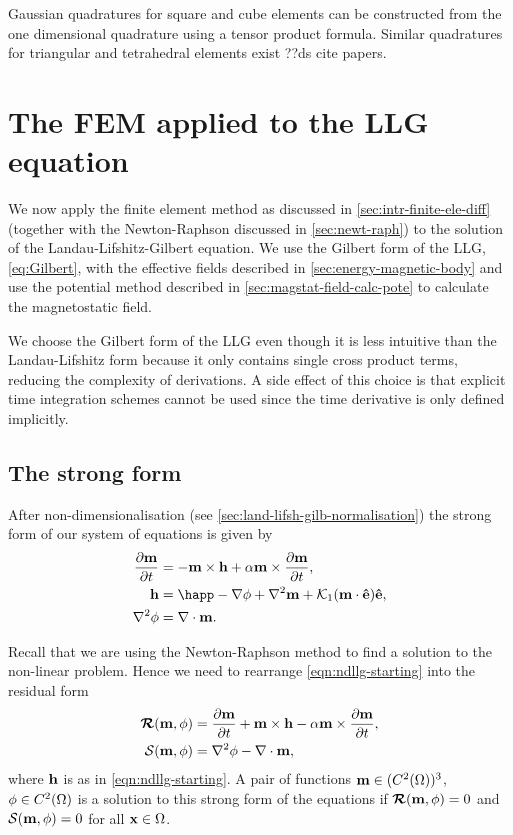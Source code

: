 Gaussian quadratures for square and cube elements can be constructed from the one dimensional quadrature using a tensor product formula.
Similar quadratures for triangular and tetrahedral elements exist \eg ??ds cite papers.




\section{The FEM applied to the LLG equation}
\label{sec:llg-initial-equations}

We now apply the finite element method as discussed in \cref{sec:intr-finite-ele-diff} (together with the Newton-Raphson discussed in \cref{sec:newt-raph}) to the solution of the Landau-Lifshitz-Gilbert equation.
We use the Gilbert form of the LLG, \cref{eq:Gilbert}, with the effective fields described in \cref{sec:energy-magnetic-body} and use the potential method described in \cref{sec:magstat-field-calc-pote} to calculate the magnetostatic field.

We choose the Gilbert form of the LLG even though it is less intuitive than the Landau-Lifshitz form because it only contains single cross product terms, reducing the complexity of derivations.
A side effect of this choice is that explicit time integration schemes cannot be used since the time derivative is only defined implicitly.

\subsection{The strong form}

After non-dimensionalisation (see \cref{sec:land-lifsh-gilb-normalisation}) the strong form of our system of equations is given by
\begin{equation}
  \begin{aligned}
    \dmdt &= - \mv \times \hv + \dampc \mv \times \dmdt, \\
    \hv &= \happ - \grad \phim + \lap \mv + \kone (\mv \cdot \ev) \ev, \\
    \lap \phim &= \div \mv.
    \label{eqn:ndllg-starting}
  \end{aligned}
\end{equation}


Recall that we are using the Newton-Raphson method to find a solution to the non-linear problem.
Hence we need to rearrange \cref{eqn:ndllg-starting} into the residual form
\begin{align}
  \label{eq:llgR}
  \boldsymbol{\mathrm{\mathcal{R}}}(\boldsymbol{\mathrm{m}}, \phi) &= \frac{\partial \boldsymbol{\mathrm{m}}}{\partial t} + \boldsymbol{\mathrm{m}} \times \boldsymbol{\mathrm{h}} - \alpha \boldsymbol{\mathrm{m}} \times \frac{\partial \boldsymbol{\mathrm{m}}}{\partial t},  \\
  \mathcal{S}(\boldsymbol{\mathrm{m}}, \phi) &= \nabla^2 \phi - \nabla \cdot \boldsymbol{\mathrm{m}}, \label{eq:phiR}
\end{align}
where $\boldsymbol{\mathrm{h}}$ is as in \cref{eqn:ndllg-starting}.
A pair of functions $\boldsymbol{\mathrm{m}} \in (C^2(\Omega))^3$, $\phi \in C^2(\Omega)$ is a solution to this strong form of the equations if $\boldsymbol{\mathrm{\mathcal{R}}}(\boldsymbol{\mathrm{m}}, \phi)=0$ and $\mathcal{S}(\boldsymbol{\mathrm{m}}, \phi)=0$ for all $\boldsymbol{\mathrm{x}} \in \Omega$.

